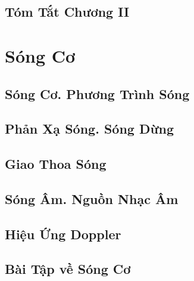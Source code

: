 \documentclass{article}
\numberwithin{equation}{section}
\begin{document}
\subsection{Tóm Tắt Chương II}


\section{Sóng Cơ}

\subsection{Sóng Cơ. Phương Trình Sóng}


\subsection{Phản Xạ Sóng. Sóng Dừng}


\subsection{Giao Thoa Sóng}


\subsection{Sóng Âm. Nguồn Nhạc Âm}


\subsection{Hiệu Ứng Doppler}


\subsection{Bài Tập về Sóng Cơ}

\end{document}
